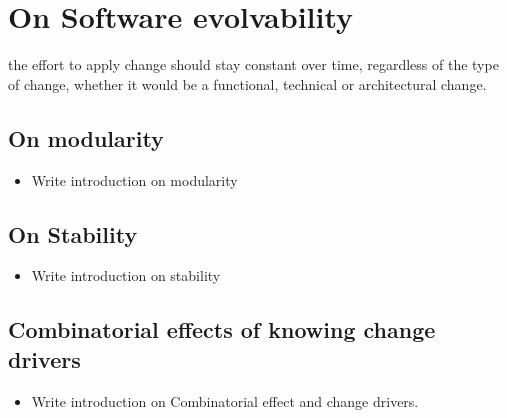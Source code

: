 \section{On Software evolvability}
the effort to apply change should stay constant over time, regardless of the type of change,
whether it would be a functional, technical or architectural change. 

\subsection{On modularity}
\begin{itemize}
    \item Write introduction on modularity
\end{itemize}
\subsection{On Stability}
\begin{itemize}
    \item Write introduction on stability
\end{itemize}

\subsection{Combinatorial effects of knowing change drivers}
\begin{itemize}
    \item Write introduction on Combinatorial effect and change drivers.
\end{itemize}